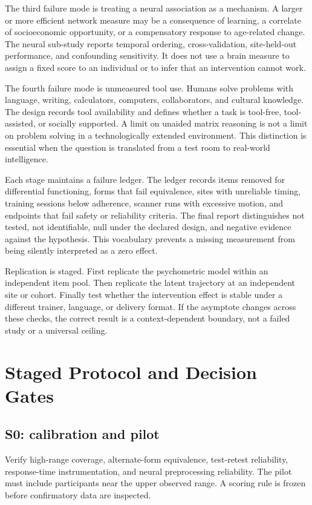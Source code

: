 \documentclass[conference]{IEEEtran}
\begin{document}
The third failure mode is treating a neural association as a mechanism. A larger or more efficient network measure may be a consequence of learning, a correlate of socioeconomic opportunity, or a compensatory response to age-related change. The neural sub-study reports temporal ordering, cross-validation, site-held-out performance, and confounding sensitivity. It does not use a brain measure to assign a fixed score to an individual or to infer that an intervention cannot work.

The fourth failure mode is unmeasured tool use. Humans solve problems with language, writing, calculators, computers, collaborators, and cultural knowledge. The design records tool availability and defines whether a task is tool-free, tool-assisted, or socially supported. A limit on unaided matrix reasoning is not a limit on problem solving in a technologically extended environment. This distinction is essential when the question is translated from a test room to real-world intelligence.

Each stage maintains a failure ledger. The ledger records items removed for differential functioning, forms that fail equivalence, sites with unreliable timing, training sessions below adherence, scanner runs with excessive motion, and endpoints that fail safety or reliability criteria. The final report distinguishes not tested, not identifiable, null under the declared design, and negative evidence against the hypothesis. This vocabulary prevents a missing measurement from being silently interpreted as a zero effect.

Replication is staged. First replicate the psychometric model within an independent item pool. Then replicate the latent trajectory at an independent site or cohort. Finally test whether the intervention effect is stable under a different trainer, language, or delivery format. If the asymptote changes across these checks, the correct result is a context-dependent boundary, not a failed study or a universal ceiling.

\section{Staged Protocol and Decision Gates}
\label{sec:gates}
\subsection{S0: calibration and pilot}
Verify high-range coverage, alternate-form equivalence, test-retest reliability, response-time instrumentation, and neural preprocessing reliability. The pilot must include participants near the upper observed range. A scoring rule is frozen before confirmatory data are inspected.
\end{document}
